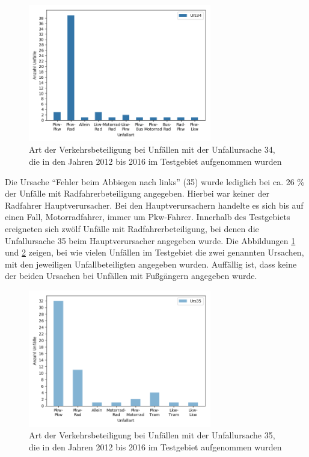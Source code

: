 \begin{savenotes}
	\begin{figure}[H]
		\centering
		\includegraphics[width=8cm,height=6cm]{figures/Urs34_Beteiligung}
		\caption[Art der Verkehrsbeteiligung bei Unfällen mit der Unfallursache 34, die in den Jahren 2012 bis 2016 im Testgebiet aufgenommen wurden]{Art der Verkehrsbeteiligung bei Unfällen mit der Unfallursache 34, die in den Jahren 2012 bis 2016 im Testgebiet aufgenommen wurden}\label{fig:Urs34_Verkehrsbeteiligung}
	\end{figure}
\end{savenotes}

Die Ursache \enquote{Fehler beim Abbiegen nach links} (35) wurde lediglich bei ca. 26 \% der Unfälle mit Radfahrerbeteiligung angegeben. Hierbei war keiner der Radfahrer Hauptverursacher. Bei den Hauptverursachern handelte es sich bis auf einen Fall, Motorradfahrer, immer um Pkw-Fahrer. Innerhalb des Testgebiets ereigneten sich zwölf Unfälle mit Radfahrerbeteiligung, bei denen die Unfallursache 35 beim Hauptverursacher angegeben wurde. Die Abbildungen \ref{fig:Urs34_Verkehrsbeteiligung} und \ref{fig:Urs35_Verkehrsbeteiligung} zeigen, bei wie vielen Unfällen im Testgebiet die zwei genannten Ursachen, mit den jeweiligen Unfallbeteiligten angegeben wurden. Auffällig ist, dass keine der beiden Ursachen bei Unfällen mit Fußgängern angegeben wurde.

\begin{savenotes}
	\begin{figure}[H]
		\centering
		\includegraphics[width=8cm,height=6cm]{figures/Urs35_Beteiligung}
		\caption[Art der Verkehrsbeteiligung bei Unfällen mit der Unfallursache 35, die in den Jahren 2012 bis 2016 im Testgebiet aufgenommen wurden]{Art der Verkehrsbeteiligung bei Unfällen mit der Unfallursache 35, die in den Jahren 2012 bis 2016 im Testgebiet aufgenommen wurden}\label{fig:Urs35_Verkehrsbeteiligung}
	\end{figure}
\end{savenotes}

